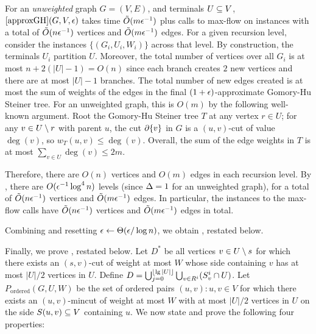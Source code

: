 \BL{}
For an \emph{unweighted} graph $G=(V,E)$, and terminals $U\subseteq V$, $\ref{approxGH}(G,V,\epsilon)$ takes time $\tilde{O}(m\epsilon^{-1})$ plus calls to max-flow on instances with a total of $\tilde{O}(n\epsilon^{-1})$ vertices and $\tilde{O}(m\epsilon^{-1})$ edges.%
\EL
\BP
For a given recursion level, consider the instances $\{ (G_i,U_i,W_i)\}$ across that level. By construction, the terminals $U_i$ partition $U$. Moreover, the total number of vertices over all $G_i$ is at most $n+2(|U|-1)=O(n)$ since each branch creates $2$ new vertices and there are at most $|U|-1$ branches. The total number of new edges created is at most the sum of weights of the edges in the final $(1+\epsilon)$-approximate Gomory-Hu Steiner tree. For an unweighted graph, this is $O(m)$ by the following well-known argument. Root the Gomory-Hu Steiner tree $T$ at any vertex $r\in U$; for any $v\in U\setminus r$ with parent $u$, the cut $\partial\{v\}$ in $G$ is a $(u,v)$-cut of value $\deg(v)$, so $w_T(u,v)\le\deg(v)$. Overall, the sum of the edge weights in $T$ is at most $\sum_{v\in U}\deg(v)\le2m$.

Therefore, there are $O(n)$ vertices and $O(m)$ edges in each recursion level. By , there are $O(\epsilon^{-1}\log^4n)$ levels (since $\Delta=1$ for an unweighted graph), for a total of $\tilde{O}(n\epsilon^{-1})$ vertices and $\tilde{O}(m\epsilon^{-1})$ edges. In particular, the instances to the max-flow calls have $\tilde{O}(n\epsilon^{-1})$ vertices and $\tilde{O}(m\epsilon^{-1})$ edges in total.
\EP

Combining  and resetting $\epsilon\gets\Theta(\epsilon/\log n)$, we obtain , restated below.
\ApproxU*

Finally, we prove , restated below.
\LemD*
\BP
Let $D^*$ be all vertices $v\in U\setminus s$ for which there exists an $(s,v)$-cut of weight at most $W$ whose side containing $v$ has at most $|U|/2$ vertices in $U$. Define $D = \bigcup_{j=0}^{\lfloor\lg|U|\rfloor}\bigcup_{v\in R^i} (S^i_v\cap U)$.
Let $P_{\text{ordered}}(G,U,W)$ be the set of ordered pairs $(u,v):u,v\in V$ for which there exists an $(u,v)$-mincut of weight at most $W$ with at most $|U|/2$ vertices in $U$ on the side $S(u,v)\subseteq V$ containing $u$. %
We now state and prove the following four properties:

